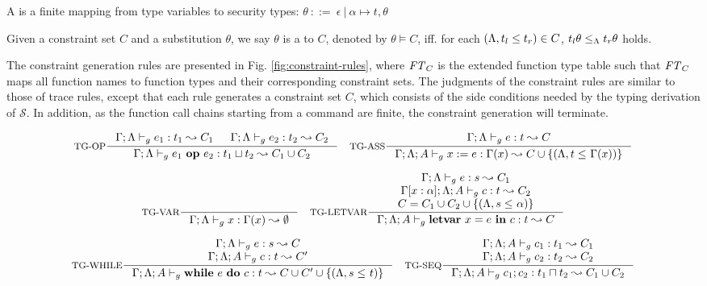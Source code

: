 {{{A  is a finite mapping from type variables to security types:
$
\theta ~::=~ \epsilon~|~\alpha \mapsto t,\theta
$


\begin{definition}
Given a constraint set $C$ and a substitution $\theta$, we say $\theta$ is a  to $C$, denoted by $\theta \vDash C $, iff. for each $(\Lambda, t_l \leq t_r) \in C$, $t_l\theta \leq_{\Lambda} t_r\theta $ holds.
\end{definition}

The constraint generation rules are presented in Fig. \ref{fig:constraint-rules}, where
$\mathit{FT}_{C}$ is the extended function type table such that $\mathit{FT}_{C}$ maps all function names to function types and their corresponding constraint sets.
The judgments of the constraint rules are similar to those of trace rules, except that
each rule generates a constraint set $C$, which consists of the side conditions needed by the typing derivation of $\mathcal{S}$.
In addition,  as the function call chains starting from a command are finite, the constraint generation will terminate.

\begin{figure*}[ht]
\begin{tiny}
\[
\inference[TG-OP]
{\Gamma;\trace \vdash_{g} e_1: t_1 \leadsto C_1 &
 \Gamma;\trace \vdash_{g} e_2: t_2 \leadsto C_2}
{\Gamma;\trace \vdash_{g} \leOP{e_1}{e_2} : t_1\sqcup t_2\leadsto C_1\cup C_2}
\quad
\inference[TG-ASS]
{\Gamma;\trace \vdash_{g} e : t \leadsto C }
{\Gamma;\trace; A \vdash_{g} \lcASS{x}{e} : \Gamma(x)\leadsto C\cup \{ (\trace, t \leq_{} \Gamma(x))\} }
\]



\[
\inference[TG-VAR]
{}
{\Gamma;\trace \vdash_{g} \leVAR{x} : \Gamma(x)\leadsto \emptyset}
\quad
\inference[TG-LETVAR]
{\Gamma;\trace \vdash_{g} e : s \leadsto C_1 \\
\Gamma[x:\alpha]; \trace; A \vdash_{g} c : t \leadsto C_2 \\
C = C_1\cup C_2 \cup \{(\trace, s \leq_{} \alpha) \}
}
{\Gamma;\trace; A\vdash_{g} \lcLETVAR{x}{e}{c} :  t\leadsto C}
\]


\[
\inference[TG-WHILE]
{
\Gamma;\trace \vdash_{g} e : s  \leadsto C \\
\Gamma;\trace; A \vdash_{g} c : t \leadsto C'
}
{\Gamma;\trace;  A \vdash_{g} \lcWHILE{e}{c} : t  \leadsto C\cup C' \cup\{(\trace,s\leq_{} t)\}}
\quad
\inference[TG-SEQ]
{
\Gamma;\trace; A \vdash_{g} c_1 : t_1  \leadsto C_1 \\
\Gamma;\trace; A \vdash_{g} c_2 : t_2 \leadsto C_2
}
{\Gamma;\trace; A \vdash_{g} \lcSEQ{c_1}{c_2} : t_1\sqcap t_2 \leadsto C_1\cup C_2}
\]


\end{tiny}
\end{figure*}}}}
